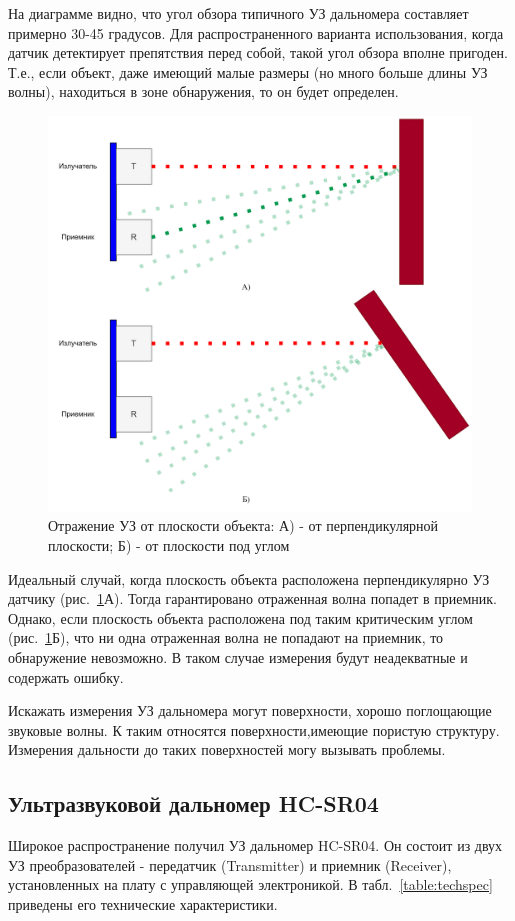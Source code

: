 \documentclass[12pt]{article}
\begin{document}
На диаграмме видно, что угол обзора типичного УЗ дальномера составляет примерно 30-45 градусов. Для распространенного варианта использования, когда датчик детектирует препятствия перед собой, такой угол обзора вполне пригоден. Т.е., если объект, даже имеющий малые размеры (но много больше длины УЗ волны), находиться в зоне обнаружения, то он будет определен. 

\begin{figure}[H]
	\centering
	\includegraphics[width=0.65\linewidth]{images/us_ortogonal}
	\caption{Отражение УЗ от плоскости объекта: А) - от перпендикулярной плоскости; Б) - от плоскости под углом}
	\label{fig:us_ortogonal}
\end{figure}

Идеальный случай, когда плоскость объекта расположена перпендикулярно УЗ датчику (рис.~\ref{fig:us_ortogonal}А). Тогда гарантировано отраженная волна попадет в приемник. Однако, если плоскость объекта расположена под таким критическим углом (рис.~\ref{fig:us_ortogonal}Б), что ни одна отраженная волна не попадают на приемник, то обнаружение невозможно. В таком случае измерения будут неадекватные и содержать ошибку.

Искажать измерения УЗ дальномера могут поверхности, хорошо поглощающие звуковые волны. К таким относятся поверхности,имеющие пористую структуру. Измерения дальности до таких поверхностей могу вызывать проблемы.

\subsection{Ультразвуковой дальномер HC-SR04}

Широкое распространение получил УЗ дальномер HC-SR04. Он состоит из двух УЗ преобразователей - передатчик (Transmitter) и приемник (Receiver), установленных на плату с управляющей электроникой. В табл.~\ref{table:techspec} приведены его технические характеристики.
\end{document}
